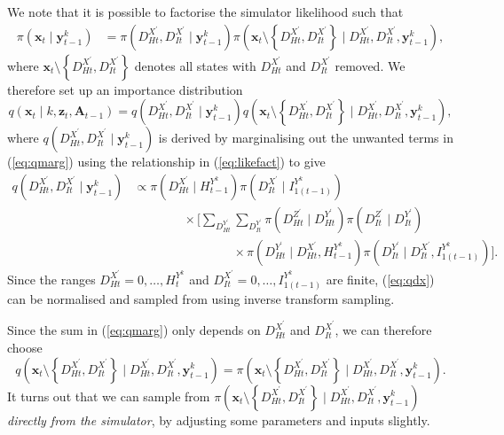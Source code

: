 \documentclass[a4paper]{article}
\newcommand{\bx}{\bm{x}}
\newcommand{\by}{\bm{y}}
\newcommand{\bz}{\bm{z}}
\newcommand{\bA}{\bm{A}}
\begin{document}
We note that it is possible to factorise the simulator likelihood such that
\begin{align}
     \pi\left(\bx_t \mid \by^k_{t - 1} \right) &= \pi\left(D^{X^\prime}_{Ht}, D^{X^\prime}_{It} \mid \by^k_{t - 1}\right)\pi\left(\bx_t \setminus \left\{D^{X^\prime}_{Ht}, D^{X^\prime}_{It}\right\} \mid D^{X^\prime}_{Ht}, D^{X^\prime}_{It}, \by^k_{t - 1}\right),\label{eq:likefact}
\end{align}
where $\bx_t \setminus \left\{D^{X^\prime}_{Ht}, D^{X^\prime}_{It}\right\}$ denotes all states with $D^{X^\prime}_{Ht}$ and $D^{X^\prime}_{It}$ removed. We therefore set up an importance distribution
\begin{equation}
    q\left(\bx_t \mid k, \bz_t, \bA_{t - 1}\right) = q\left(D^{X^\prime}_{Ht}, D^{X^\prime}_{It} \mid \by^k_{t - 1}\right)q\left(\bx_t \setminus \left\{D^{X^\prime}_{Ht}, D^{X^\prime}_{It}\right\} \mid D^{X^\prime}_{Ht}, D^{X^\prime}_{It}, \by^k_{t - 1}\right),
\end{equation}
where $q\left(D^{X^\prime}_{Ht}, D^{X^\prime}_{It} \mid \by^k_{t - 1}\right)$ is derived by marginalising out the unwanted terms in (\ref{eq:qmarg}) using the relationship in (\ref{eq:likefact}) to give
\begin{align}
     q\left(D^{X^\prime}_{Ht}, D^{X^\prime}_{It} \mid \by^k_{t - 1}\right) &\propto \pi\left(D^{X^\prime}_{Ht} \mid H^{Y^k}_{t - 1}\right)\pi\left(D^{X^\prime}_{It} \mid I^{Y^k}_{1(t - 1)}\right) \nonumber\\
    & \qquad \qquad \times \Bigg[\sum_{D^{Y^\prime}_{Ht}}\sum_{D^{Y^\prime}_{It}} \pi\left(D^{Z^\prime}_{Ht} \mid D^{Y^\prime}_{Ht}\right)\pi\left(D^{Z^\prime}_{It} \mid D^{Y^\prime}_{It}\right)\nonumber\\
    & \qquad \qquad \qquad \qquad \times\pi\left(D^{Y^\prime}_{Ht} \mid D^{X^\prime}_{Ht}, H^{Y^k}_{t - 1}\right)\pi\left(D^{Y^\prime}_{It} \mid D^{X^\prime}_{It}, I^{Y^k}_{1(t - 1)}\right)\Bigg].\label{eq:qdx}
\end{align}
Since the ranges $D^{X^\prime}_{Ht} = 0, \dots, H^{Y^k}_t$ and $D^{X^\prime}_{It} = 0, \dots, I^{Y^k}_{1(t - 1)}$ are finite, (\ref{eq:qdx}) can be normalised and sampled from using inverse transform sampling.

Since the sum in (\ref{eq:qmarg}) only depends on $D^{X^\prime}_{Ht}$ and $D^{X^\prime}_{It}$, we can therefore choose
\begin{equation}
    q\left(\bx_t \setminus \left\{D^{X^\prime}_{Ht}, D^{X^\prime}_{It}\right\} \mid D^{X^\prime}_{Ht}, D^{X^\prime}_{It}, \by^k_{t - 1}\right) = \pi\left(\bx_t \setminus \left\{D^{X^\prime}_{Ht}, D^{X^\prime}_{It}\right\} \mid D^{X^\prime}_{Ht}, D^{X^\prime}_{It}, \by^k_{t - 1}\right).\label{eq:condq}
\end{equation}
It turns out that we can sample from $\pi\left(\bx_t \setminus \left\{D^{X^\prime}_{Ht}, D^{X^\prime}_{It}\right\} \mid D^{X^\prime}_{Ht}, D^{X^\prime}_{It}, \by^k_{t - 1}\right)$ \textit{directly from the simulator}, by adjusting some parameters and inputs slightly.
\end{document}
